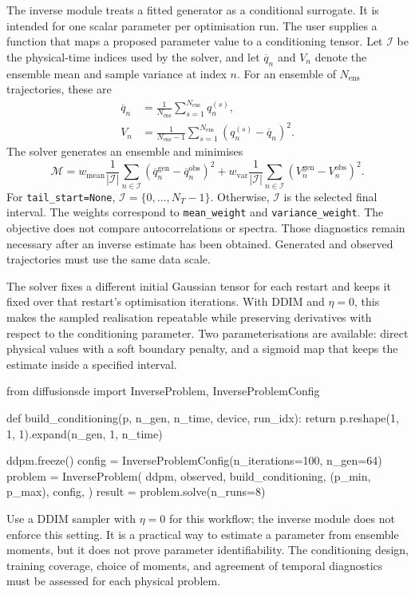 The inverse module treats a fitted generator as a conditional surrogate. It is
intended for one scalar parameter per optimisation run. The user supplies a
function that maps a proposed parameter value to a conditioning tensor. Let
$\mathcal{I}$ be the physical-time indices used by the solver, and let
$\overline{q}_n$ and $V_n$ denote the ensemble mean and sample variance at index
$n$. For an ensemble of $N_{\mathrm{ens}}$ trajectories, these are
\begin{align}
  \overline{q}_n
  &=
  \frac{1}{N_{\mathrm{ens}}}
  \sum_{s=1}^{N_{\mathrm{ens}}}q_n^{(s)},
  \label{eq:ensemble_mean}\\
  V_n
  &=
  \frac{1}{N_{\mathrm{ens}}-1}
  \sum_{s=1}^{N_{\mathrm{ens}}}
  \left(q_n^{(s)}-\overline{q}_n\right)^2 .
  \label{eq:ensemble_variance}
\end{align}
The solver generates an ensemble and minimises
\begin{equation}
  \mathcal{M}
  = w_{\mathrm{mean}}\frac{1}{\lvert\mathcal{I}\rvert}
    \sum_{n\in\mathcal{I}}
    \left(\overline{q}_n^{\mathrm{gen}}-\overline{q}_n^{\mathrm{obs}}\right)^2
  + w_{\mathrm{var}}\frac{1}{\lvert\mathcal{I}\rvert}
    \sum_{n\in\mathcal{I}}
    \left(V_n^{\mathrm{gen}}-V_n^{\mathrm{obs}}\right)^2 .
  \label{eq:moment_matching_loss}
\end{equation}
For \texttt{tail\_start=None}, $\mathcal{I}=\{0,\ldots,N_T-1\}$. Otherwise,
$\mathcal{I}$ is the selected final interval. The weights correspond to
\texttt{mean\_weight} and \texttt{variance\_weight}. The objective does not
compare autocorrelations or spectra. Those diagnostics remain necessary after an
inverse estimate has been obtained. Generated and observed trajectories must use
the same data scale.

The solver fixes a different initial Gaussian tensor for each restart and keeps it
fixed over that restart's optimisation iterations. With DDIM and $\eta=0$, this
makes the sampled realisation repeatable while preserving derivatives with respect
to the conditioning parameter. Two parameterisations are available: direct
physical values with a soft boundary penalty, and a sigmoid map that keeps the
estimate inside a specified interval.

\begin{pythonlisting}
from diffusionsde import InverseProblem, InverseProblemConfig

def build_conditioning(p, n_gen, n_time, device, run_idx):
    return p.reshape(1, 1, 1).expand(n_gen, 1, n_time)

ddpm.freeze()
config = InverseProblemConfig(n_iterations=100, n_gen=64)
problem = InverseProblem(
    ddpm, observed, build_conditioning, (p_min, p_max), config,
)
result = problem.solve(n_runs=8)
\end{pythonlisting}

Use a DDIM sampler with $\eta=0$ for this workflow; the inverse module does not
enforce this setting. It is a practical way to estimate a parameter from ensemble
moments, but it does not prove parameter identifiability. The conditioning design,
training coverage, choice of moments, and agreement of temporal diagnostics must
be assessed for each physical problem.
